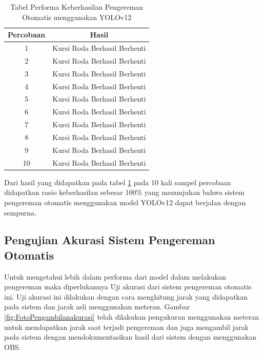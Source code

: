 \begin{table}[H]
  \centering
  \caption{Tabel Performa Keberhasilan Pengereman Otomatis menggunakan YOLOv12}
  \label{tb:tabelyolov12performa}
  \begin{tabular}{|c|c|}
  \hline
  Percobaan & Hasil                                                \\ \hline
  1         & \cellcolor[HTML]{34FF34}Kursi Roda Berhasil Berhenti \\ \hline
  2         & \cellcolor[HTML]{34FF34}Kursi Roda Berhasil Berhenti \\ \hline
  3         & \cellcolor[HTML]{34FF34}Kursi Roda Berhasil Berhenti \\ \hline
  4         & \cellcolor[HTML]{34FF34}Kursi Roda Berhasil Berhenti \\ \hline
  5         & \cellcolor[HTML]{34FF34}Kursi Roda Berhasil Berhenti \\ \hline
  6         & \cellcolor[HTML]{34FF34}Kursi Roda Berhasil Berhenti \\ \hline
  7         & \cellcolor[HTML]{34FF34}Kursi Roda Berhasil Berhenti \\ \hline
  8         & \cellcolor[HTML]{34FF34}Kursi Roda Berhasil Berhenti \\ \hline
  9         & \cellcolor[HTML]{34FF34}Kursi Roda Berhasil Berhenti \\ \hline
  10        & \cellcolor[HTML]{34FF34}Kursi Roda Berhasil Berhenti \\ \hline
  \end{tabular}
\end{table}

Dari hasil yang didapatkan pada tabel \ref{tb:tabelyolov12performa} pada 10 kali sampel percobaan didapatkan rasio keberhasilan sebesar 100\% yang menunjukan bahwa sistem pengereman otomatis menggunakan model YOLOv12 dapat berjalan dengan sempurna.

\subsection{Pengujian Akurasi Sistem Pengereman Otomatis}
Untuk mengetahui lebih dalam performa dari model dalam melakukan pengereman maka diperlukannya Uji akurasi dari sistem pengereman otomatis ini. Uji akurasi ini dilakukan dengan cara menghitung jarak yang didapatkan pada sistem dan jarak asli menggunakan meteran. Gambar \ref{fig:FotoPengambilanakurasi} telah dilakukan pengukuran menggunakan meteran untuk mendapatkan jarak saat terjadi pengereman dan juga mengambil jarak pada sistem dengan mendokumentasikan hasil dari sistem dengan menggunakan OBS.

